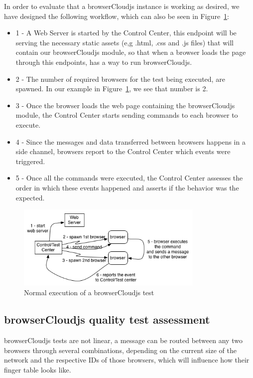 In order to evaluate that a browserCloudjs instance is working as desired, we have designed the following workflow, which can also be seen in Figure~\ref{fig:t-f-1}:

\begin{itemize}
    \item 1 - A Web Server is started by the Control Center, this endpoint will be serving the necessary static assets (e,g .html, .css and .js files) that will contain our browserCloudjs module, so that when a browser loads the page through this endpoints, has a way to run browserCloudjs.
    \item 2 - The number of required browsers for the test being executed, are spawned. In our example in Figure~\ref{fig:t-f-1}, we see that number is 2.
    \item 3 - Once the browser loads the web page containing the browserCloudjs module, the Control Center starts sending commands to each browser to execute.
    \item 4 - Since the messages and data transferred between browsers happens in a side channel, browsers report to the Control Center which events were triggered.
    \item 5 - Once all the commands were executed, the Control Center assesses the order in which these events happened and asserts if the behavior was the expected.
\end{itemize}

\begin{figure}[h!]
  \centering
  \includegraphics[width=0.8\textwidth]{figs/testing-framework-1}
  \caption{Normal execution of a browserCloudjs test}
  \label{fig:t-f-1}
\end{figure}

\subsection{browserCloudjs quality test assessment}

browserCloudjs tests are not linear, a message can be routed between any two browsers through several combinations, depending on the current size of the network and the respective IDs of those browsers, which will influence how their finger table looks like.

